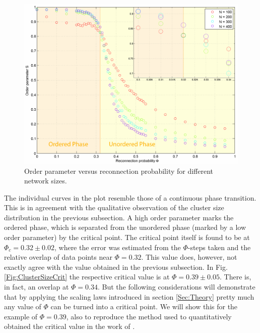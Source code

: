 \documentclass[11pt]{article}
\begin{document}
\begin{figure}[h!]
  \centering
    \includegraphics[scale=0.7]{Plots/SvsPHI_combined2.pdf}
  \caption{Order parameter versus reconnection probability for different network sizes.}
  \label{Fig:SvsPHI}
\end{figure}

The individual curves in the plot resemble those of a continuous phase transition. This is in agreement with the qualitative observation of the cluster size distribution in the previous subsection. A high order parameter marks the ordered phase, which is separated from the unordered phase (marked by a low order parameter) by the critical point. The critical point itself is found to be at $\Phi_c = 0.32 \pm 0.02$, where the error was estimated from the $\Phi$-steps taken and the relative overlap of data points near $\Phi=0.32$. This value does, however, not exactly agree with the value obtained in the previous subsection. In Fig. \ref{Fig:ClusterSizeCrit} the respective critical value is at $\Phi=0.39 \pm 0.05$. There is, in fact, an overlap at $\Phi=0.34$. But the following considerations will demonstrate that by applying the scaling laws introduced in section \ref{Sec:Theory} pretty much any value of $\Phi$ can be turned into a critical point. We will show this for the example of $\Phi=0.39$, also to reproduce the method used to quantitatively obtained the critical value in the work of \cite{main paper}.
\end{document}
